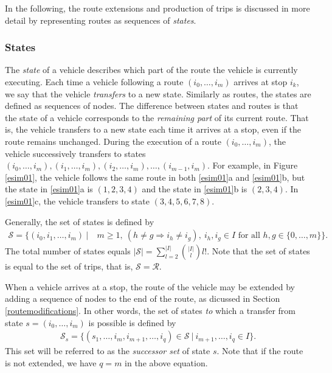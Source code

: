 \documentclass[dissertation,draft*]{aaltoseries}
\begin{document}
In the following, the route extensions and production of trips is discussed in more detail
by representing routes as sequences of \emph{states}.


\subsubsection{States}
The \emph{state} of a vehicle describes which part of the route the vehicle is currently executing.
Each time a vehicle following a route $(i_0,\ldots,i_m)$ arrives at stop $i_k$, 
we say that the vehicle \emph{transfers} to a new state.
Similarly as routes, the states are defined as sequences of nodes.
The difference between states and routes
is that the state of a vehicle corresponds to the \emph{remaining part} of its current route. 
That is, the vehicle transfers to a new state each time it arrives at a stop, even if the route remains unchanged.
During the execution of a route $(i_0,\ldots,i_m)$, the vehicle successively transfers to states 
$(i_0,\ldots,i_m),(i_1,\ldots,i_m),(i_2,\ldots,i_m),\ldots,(i_{m-1},i_m)$.
For example, in Figure \ref{esim01}, the vehicle follows the same route in both \ref{esim01}a and \ref{esim01}b,
but the state in \ref{esim01}a is $(1,2,3,4)$ and the state in \ref{esim01}b is $(2,3,4)$. In \ref{esim01}c,
the vehicle transfers to state $(3,4,5,6,7,8)$.

Generally, the set of states is defined by
\begin{align*}
\mathcal{S} = \{ (i_0,i_1,\ldots, i_m) \ | \ & m \geq 1, \ (h \neq g \Rightarrow i_h \neq i_g), \ i_h,i_g \in I  \mbox{ for all } h,g \in \{0,\ldots,m\} \}.
\end{align*}
The total number of states equals $|\mathcal{S}| = \sum_{l=2}^{|I|} {|I| \choose l} l!$.
Note that the set of states is equal to the set of trips, that is, $\mathcal{S}=\mathcal{R}$.

When a vehicle arrives at a stop, the route of the vehicle may be extended by adding a sequence of nodes to the
end of the route, as dicussed in Section \ref{routemodifications}. In other words, the set of states \emph{to} 
which a transfer from state $s = (i_0,\ldots,i_m)$ is possible is defined by
\begin{align}
\label{successors}
\mathcal{S}_{s} = \{ (s_1,\ldots ,i_m,i_{m+1},\ldots,i_q) \in \mathcal{S} \ | \ i_{m+1},\ldots,i_q \in I \}.
\end{align}
This set will be referred to as the \emph{successor set} of state $s$.
Note that if the route is not extended, we have $q=m$ in the above equation.
\end{document}
